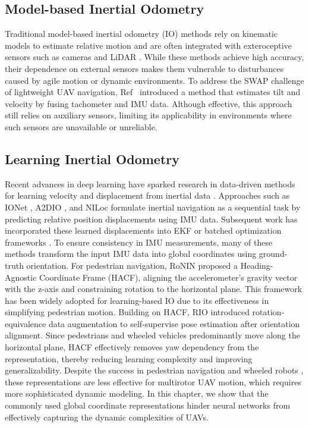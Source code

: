 \subsection{Model-based Inertial Odometry}
Traditional model-based inertial odometry (IO) methods rely on kinematic models \cite{forster2015imu} to estimate relative motion and are often integrated with exteroceptive sensors such as cameras \cite{qin2018vins} and LiDAR \cite{zhao2021super}. While these methods achieve high accuracy, their dependence on external sensors makes them vulnerable to disturbances caused by agile motion or dynamic environments.
To address the SWAP challenge of lightweight UAV navigation, Ref~\cite{svacha2020imu} introduced a method that estimates tilt and velocity by fusing tachometer and IMU data.
Although effective, this approach still relies on auxiliary sensors, limiting its applicability in environments where such sensors are unavailable or unreliable.

\subsection{Learning Inertial Odometry}
Recent advances in deep learning have sparked research in data-driven methods for learning velocity and displacement from inertial data \cite{yan2018ridi, chen2018ionet, herath2020ronin, herath2022neural}.
Approaches such as IONet \cite{chen2018ionet}, A2DIO \cite{wang2022a2dio}, and NILoc \cite{herath2022neural} formulate inertial navigation as a sequential task by predicting relative position displacements using IMU data.
Subsequent work has incorporated these learned displacements into EKF \cite{liu2020tlio, sun2021idol, deng2023data} or batched optimization frameworks \cite{buchanan2022learning}.
To ensure consistency in IMU measurements, many of these methods transform the input IMU data into global coordinates using ground-truth orientation.
For pedestrian navigation, RoNIN \cite{herath2020ronin} proposed a Heading-Agnostic Coordinate Frame (HACF), aligning the accelerometer's gravity vector with the z-axis and constraining rotation to the horizontal plane. This framework has been widely adopted for learning-based IO \cite{liu2020tlio, sun2021idol} due to its effectiveness in simplifying pedestrian motion.
Building on HACF, RIO \cite{cao2022rio} introduced rotation-equivalence data augmentation to self-supervise pose estimation after orientation alignment.
Since pedestrians and wheeled vehicles predominantly move along the horizontal plane, HACF effectively removes yaw dependency from the representation, thereby reducing learning complexity and improving generalizability.
Despite the success in pedestrian navigation and wheeled robots \cite{herath2020ronin, brossard2019rins}, these representations are less effective for multirotor UAV motion, which requires more sophisticated dynamic modeling.
In this chapter, we show that the commonly used global coordinate representations hinder neural networks from effectively capturing the dynamic complexities of UAVs.

